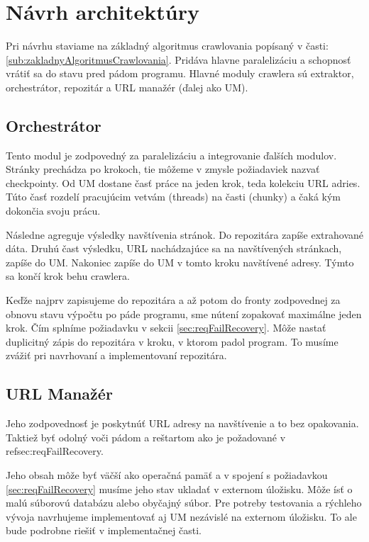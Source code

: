\section{Návrh architektúry}

Pri návrhu staviame na základný algoritmus crawlovania popísaný v časti: \ref{sub:zakladnyAlgoritmusCrawlovania}. Pridáva hlavne paralelizáciu a schopnosť vrátiť sa do stavu pred pádom programu. Hlavné moduly crawlera sú  extraktor, orchestrátor, repozitár a URL manažér (ďalej ako UM). 

\subsection{Orchestrátor}
Tento modul je zodpovedný  za paralelizáciu a integrovanie ďalších modulov. Stránky prechádza po krokoch, tie môžeme v zmysle požiadaviek nazvať checkpointy. Od UM dostane časť práce na jeden krok, teda kolekciu URL adries. Túto časť rozdelí pracujúcim vetvám (threads) na časti (chunky) a čaká kým dokončia svoju prácu. 

Následne agreguje výsledky navštívenia stránok. Do repozitára zapíše extrahované dáta. Druhú čast výsledku, URL nachádzajúce sa na navštívených stránkach, zapíše do UM. Nakoniec zapíše do UM v tomto kroku navštívené adresy. Týmto sa končí krok behu crawlera.

Keďže najprv zapisujeme do repozitára a až potom do fronty zodpovednej za obnovu stavu výpočtu po páde programu, sme nútení zopakovať maximálne jeden krok. Čím splníme požiadavku v sekcii \ref{sec:reqFailRecovery}. Môže nastať duplicitný zápis do repozitára v kroku, v ktorom padol program. To musíme zvážiť pri navrhovaní a implementovaní repozitára. 

\subsection{URL Manažér}
Jeho zodpovednosť je poskytnúť URL adresy na navštívenie a to bez opakovania. Taktiež byť odolný voči pádom a reštartom ako je požadované v ref{sec:reqFailRecovery}.

Jeho obsah môže byť väčší ako operačná pamäť a v spojení s požiadavkou \ref{sec:reqFailRecovery} musíme jeho stav ukladať v externom úložisku. Môže ísť o malú súborovú databázu alebo obyčajný súbor. Pre potreby testovania a rýchleho vývoja navrhujeme implementovať aj UM nezávislé na externom úložisku. To ale bude podrobne riešiť v implementačnej časti. 



